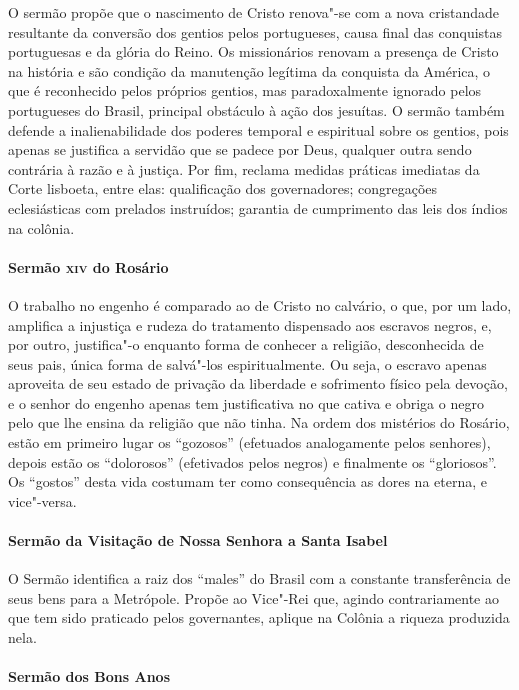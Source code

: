 O sermão propõe que o nascimento de Cristo renova"-se com a nova cristandade resultante
da conversão dos gentios pelos portugueses, causa final das conquistas portuguesas e da
glória do Reino. Os missionários renovam a presença de Cristo na história e são condição
da manutenção legítima da conquista da América, o que é reconhecido pelos próprios
gentios, mas paradoxalmente ignorado pelos portugueses do Brasil, principal obstáculo à
ação dos jesuítas. O sermão também defende a inalienabilidade dos poderes temporal e
espiritual sobre os gentios, pois apenas se justifica a servidão que se padece por Deus,
qualquer outra sendo contrária à razão e à justiça. Por fim, reclama medidas práticas
imediatas da Corte lisboeta, entre elas: qualificação dos governadores; congregações
eclesiásticas com prelados instruídos; garantia de cumprimento das leis dos índios na colônia.

\paragraph{Sermão \textsc{xiv} do Rosário}

O trabalho no engenho é comparado ao de Cristo no calvário, o que, por um lado, amplifica
a injustiça e rudeza do tratamento dispensado aos escravos negros, e, por outro, justifica"-o
enquanto forma de conhecer a religião, desconhecida de seus pais, única forma de salvá"-los
espiritualmente. Ou seja, o escravo apenas aproveita de seu estado de privação da liberdade
e sofrimento físico pela devoção, e o senhor do engenho apenas tem justificativa no que
cativa e obriga o negro pelo que lhe ensina da religião que não tinha. Na ordem dos mistérios
do Rosário, estão em primeiro lugar os ``gozosos'' (efetuados analogamente pelos senhores),
depois estão os ``dolorosos'' (efetivados pelos negros) e finalmente os ``gloriosos''. Os ``gostos'' desta vida costumam ter como consequência as dores na eterna, e vice"-versa.

\paragraph{Sermão da Visitação de Nossa Senhora a Santa Isabel}

O Sermão identifica a raiz dos ``males'' do Brasil com a constante transferência de seus bens para a Metrópole. Propõe ao Vice"-Rei que, agindo contrariamente ao que tem sido praticado pelos governantes, aplique na Colônia a riqueza produzida nela.

\paragraph{Sermão dos Bons Anos}

